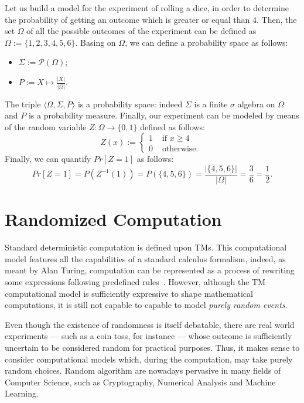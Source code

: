 \begin{ex}
  Let us build a model for the experiment of rolling a dice, in order to determine the probability of getting an outcome which is greater or equal than $4$. Then, the set $\Omega$ of all the possible outcomes of the experiment can be defined as $\Omega:=\{1,2,3,4,5,6\}$.
  Basing on $\Omega$, we can define a probability space as follows:
  \begin{itemize}
    \item $\Sigma:=\mathcal P (\Omega)$;
    \item $P:=X \mapsto \frac{|X|}{|\Omega|}$.
  \end{itemize}
  The triple $\langle \Omega, \Sigma, P\rangle$ is a probability
  space: indeed $\Sigma$ is a finite $\sigma$ algebra on $\Omega$ and
  $P$ is a probability measure.
  Finally, our experiment can be modeled by means of the random
  variable $Z: \Omega \longrightarrow \{0, 1\}$ defined as follows:
  $$
  Z(x):= \begin{cases}
  1 & \text{ if }x\ge 4\\
  0 & \text{ otherwise. }
  \end{cases}
  $$
  Finally, we can quantify $\mathit{Pr}[Z=1]$ as follows:
  $$
  \mathit{Pr}[Z=1]=P(Z^{-1}(1))=P(\{4, 5, 6\})= \frac{|\{4, 5, 6\}|}{|\Omega|}= \frac 3 6 = \frac 1 2.
  $$

\end{ex}





\section{Randomized Computation}

Standard deterministic computation is defined upon TMs.
This computational model features all the
capabilities of a standard calculus formalism, indeed, as meant by Alan Turing,
computation can be represented as a process of rewriting some expressions
following predefined rules~\cite{rogers1987theory}.
%
However, although the TM computational model is sufficiently
expressive to shape mathematical computations, it is still not capable to
capable to model \emph{purely random events}.

Even though the existence of randomness is itself debatable, there
are real world experiments --- such as a coin toss, for instance ---
whose outcome is sufficiently uncertain to be considered random  for practical purposes.
%
Thus, it makes sense to consider computational models which, during
the computation, may take purely random choices.
%
Random algorithm are nowadays pervasive in many fields of Computer Science,
such as Cryptography, Numerical Analysis and Machine Learning.

